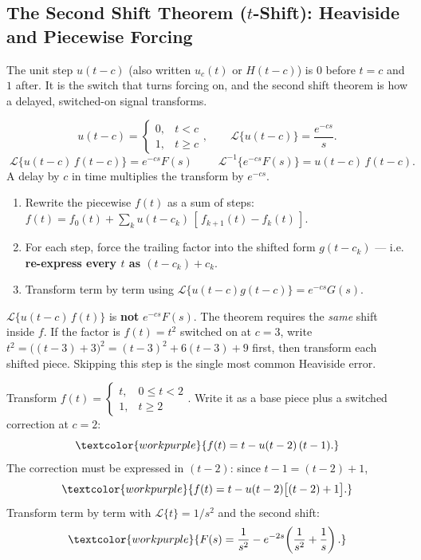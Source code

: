 \subsection{The Second Shift Theorem ($t$-Shift): Heaviside and Piecewise Forcing}

The unit step $u(t-c)$ (also written $u_c(t)$ or $H(t-c)$) is $0$ before $t=c$ and
$1$ after. It is the switch that turns forcing on, and the second shift theorem is
how a delayed, switched-on signal transforms.

\begin{formulabox}
\[ u(t-c) = \begin{cases} 0, & t<c\\ 1, & t\ge c \end{cases}, \qquad
   \mathcal{L}\{u(t-c)\} = \frac{e^{-cs}}{s}. \]
\[ \boxed{\;\mathcal{L}\{u(t-c)\,f(t-c)\} = e^{-cs} F(s)\;} \qquad
   \mathcal{L}^{-1}\{e^{-cs}F(s)\} = u(t-c)\,f(t-c). \]
A delay by $c$ in time multiplies the transform by $e^{-cs}$.
\end{formulabox}

\begin{methodbox}
\begin{enumerate}
    \item Rewrite the piecewise $f(t)$ as a sum of steps:
          $f(t) = f_0(t) + \sum_k u(t-c_k)\,[\,f_{k+1}(t)-f_k(t)\,]$.
    \item For each step, force the trailing factor into the shifted form
          $g(t-c_k)$ --- i.e. \textbf{re-express every $t$ as $(t-c_k)+c_k$}.
    \item Transform term by term using $\mathcal{L}\{u(t-c)g(t-c)\}=e^{-cs}G(s)$.
\end{enumerate}
\end{methodbox}

\begin{warningbox}
$\mathcal{L}\{u(t-c)\,f(t)\}$ is \textbf{not} $e^{-cs}F(s)$. The theorem requires the
\emph{same} shift inside $f$. If the factor is $f(t)=t^2$ switched on at $c=3$, write
$t^2 = \big((t-3)+3\big)^2 = (t-3)^2 + 6(t-3) + 9$ first, then transform each shifted
piece. Skipping this step is the single most common Heaviside error.
\end{warningbox}

\begin{examplebox}
Transform $f(t) = \begin{cases} t, & 0\le t<2 \\ 1, & t\ge 2 \end{cases}$. Write it as
a base piece plus a switched correction at $c=2$:
\[ \textcolor{workpurple}{f(t) = t - u(t-2)\,(t-1).} \]
The correction must be expressed in $(t-2)$: since $t-1 = (t-2)+1$,
\[ \textcolor{workpurple}{f(t) = t - u(t-2)\big[(t-2)+1\big].} \]
Transform term by term with $\mathcal{L}\{t\}=1/s^2$ and the second shift:
\[ \textcolor{workpurple}{F(s) = \frac{1}{s^2}
   - e^{-2s}\!\left(\frac{1}{s^2} + \frac{1}{s}\right).} \]
\end{examplebox}

